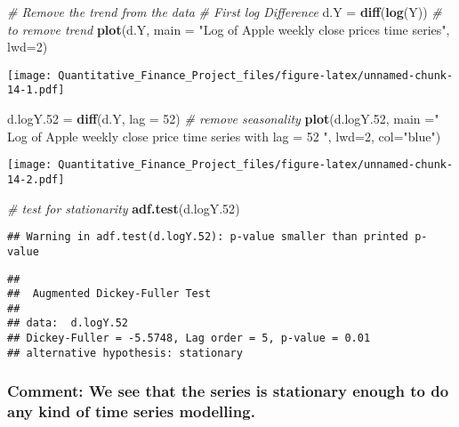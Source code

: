 \documentclass[
]{article}
\newenvironment{Shaded}{\begin{snugshade}}{\end{snugshade}}
\newcommand{\AttributeTok}[1]{\textcolor[rgb]{0.13,0.29,0.53}{#1}}
\newcommand{\CommentTok}[1]{\textcolor[rgb]{0.56,0.35,0.01}{\textit{#1}}}
\newcommand{\DecValTok}[1]{\textcolor[rgb]{0.00,0.00,0.81}{#1}}
\newcommand{\FloatTok}[1]{\textcolor[rgb]{0.00,0.00,0.81}{#1}}
\newcommand{\FunctionTok}[1]{\textcolor[rgb]{0.13,0.29,0.53}{\textbf{#1}}}
\newcommand{\NormalTok}[1]{#1}
\newcommand{\OtherTok}[1]{\textcolor[rgb]{0.56,0.35,0.01}{#1}}
\newcommand{\StringTok}[1]{\textcolor[rgb]{0.31,0.60,0.02}{#1}}
\begin{document}
\begin{Shaded}
\begin{Highlighting}[]
\CommentTok{\# Remove the trend from the data}
\CommentTok{\# First log Difference}
\NormalTok{d.Y }\OtherTok{=} \FunctionTok{diff}\NormalTok{(}\FunctionTok{log}\NormalTok{(Y)) }\CommentTok{\# to remove trend}
\FunctionTok{plot}\NormalTok{(d.Y, }\AttributeTok{main =} \StringTok{"Log of Apple weekly close prices time series"}\NormalTok{, }\AttributeTok{lwd=}\DecValTok{2}\NormalTok{)}
\end{Highlighting}
\end{Shaded}

\texttt{[image: Quantitative\_Finance\_Project\_files/figure-latex/unnamed-chunk-14-1.pdf]}

\begin{Shaded}
\begin{Highlighting}[]
\NormalTok{d.logY}\FloatTok{.52} \OtherTok{=} \FunctionTok{diff}\NormalTok{(d.Y, }\AttributeTok{lag =} \DecValTok{52}\NormalTok{)  }\CommentTok{\# remove seasonality}
\FunctionTok{plot}\NormalTok{(d.logY}\FloatTok{.52}\NormalTok{, }\AttributeTok{main =}\StringTok{" Log of Apple weekly close price time series with lag = 52 "}\NormalTok{, }\AttributeTok{lwd=}\DecValTok{2}\NormalTok{, }\AttributeTok{col=}\StringTok{"blue"}\NormalTok{)}
\end{Highlighting}
\end{Shaded}

\texttt{[image: Quantitative\_Finance\_Project\_files/figure-latex/unnamed-chunk-14-2.pdf]}

\begin{Shaded}
\begin{Highlighting}[]
\CommentTok{\# test for stationarity}
\FunctionTok{adf.test}\NormalTok{(d.logY}\FloatTok{.52}\NormalTok{)}
\end{Highlighting}
\end{Shaded}

\begin{verbatim}
## Warning in adf.test(d.logY.52): p-value smaller than printed p-value
\end{verbatim}

\begin{verbatim}
## 
##  Augmented Dickey-Fuller Test
## 
## data:  d.logY.52
## Dickey-Fuller = -5.5748, Lag order = 5, p-value = 0.01
## alternative hypothesis: stationary
\end{verbatim}

\hypertarget{comment-we-see-that-the-series-is-stationary-enough-to-do-any-kind-of-time-series-modelling.-1}{%
\subsubsection{Comment: We see that the series is stationary enough to
do any kind of time series
modelling.}\label{comment-we-see-that-the-series-is-stationary-enough-to-do-any-kind-of-time-series-modelling.-1}}
\end{document}
